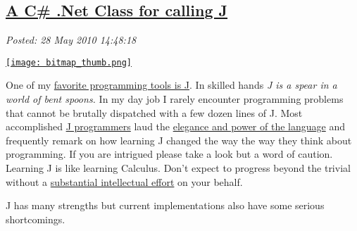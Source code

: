 %

\subsection*{\href{https://bakerjd99.wordpress.com/2010/05/28/a-c-net-class-for-calling-j/}{A C\# .Net Class for calling J}}


\noindent\emph{Posted: 28 May 2010 14:48:18}
\vspace{6pt}

\captionsetup[floatingfigure]{labelformat=empty}
\begin{floatingfigure}[l]{0.12\textwidth}
\centering
\href{http://www.jsoftware.com/}{\texttt{[image: bitmap\_thumb.png]}}
\label{fig:537X0}
\end{floatingfigure}One of my \href{http://www.jsoftware.com/}{favorite programming tools is
J}. In skilled hands \emph{J is a spear in a world of bent spoons.} In my
day job I rarely encounter programming problems that cannot be brutally
dispatched with a few dozen lines of J. Most accomplished
\href{http://www.lulu.com/product/paperback/j-for-c-programmers/4669553}{J
programmers} laud the
\href{http://portal.acm.org/citation.cfm?id=508562}{elegance and power
of the language} and frequently remark on how learning J changed the way
the way they think about programming. If you are intrigued please take a
look but a word of caution. Learning J is like learning Calculus. Don't
expect to progress beyond the trivial without a
\href{http://norvig.com/21-days.html}{substantial intellectual effort}
on your behalf.

J has many strengths but current implementations also have some serious
shortcomings.

